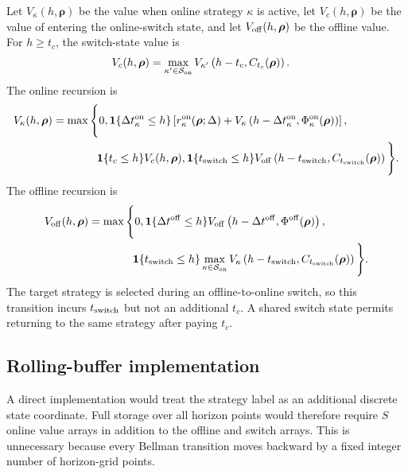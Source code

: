 \documentclass{article}
\newcommand*\I{\mathbf 1}
\begin{document}
Let $V_\kappa(h,\boldsymbol\rho)$ be the value when online strategy $\kappa$ is active, let $V_c(h,\boldsymbol\rho)$ be the value of entering the online-switch state, and let $V_{\rm off}(h,\boldsymbol\rho)$ be the offline value. For $h\geq t_c$, the switch-state value is
\begin{align}
V_c(h,\boldsymbol\rho) &= \max_{\kappa'\in\mathcal S_{\rm on}}V_{\kappa'}\left(h-t_c,C_{t_c}(\boldsymbol\rho)\right).
\end{align}
The online recursion is
\begin{align}
V_\kappa(h,\boldsymbol\rho) &= \max\Bigg\{0,\I\{\Delta t_\kappa^{\rm on}\leq h\}\left[r_\kappa^{\rm on}(\boldsymbol\rho;\Delta)+V_\kappa\left(h-\Delta t_\kappa^{\rm on},\Phi_\kappa^{\rm on}(\boldsymbol\rho)\right)\right], \notag\\
&\qquad\qquad\I\{t_c\leq h\}V_c(h,\boldsymbol\rho),\I\{t_{\rm switch}\leq h\}V_{\rm off}\left(h-t_{\rm switch},C_{t_{\rm switch}}(\boldsymbol\rho)\right)\Bigg\}.
\end{align}
The offline recursion is
\begin{align}
V_{\rm off}(h,\boldsymbol\rho) &= \max\Bigg\{0,\I\{\Delta t^{\rm off}\leq h\}V_{\rm off}\left(h-\Delta t^{\rm off},\Phi^{\rm off}(\boldsymbol\rho)\right), \notag\\
&\qquad\qquad\I\{t_{\rm switch}\leq h\}\max_{\kappa\in\mathcal S_{\rm on}}V_\kappa\left(h-t_{\rm switch},C_{t_{\rm switch}}(\boldsymbol\rho)\right)\Bigg\}.
\end{align}
The target strategy is selected during an offline-to-online switch, so this transition incurs $t_{\rm switch}$ but not an additional $t_c$. A shared switch state permits returning to the same strategy after paying $t_c$.

\subsection{Rolling-buffer implementation}

A direct implementation would treat the strategy label as an additional discrete state coordinate. Full storage over all horizon points would therefore require $S$ online value arrays in addition to the offline and switch arrays. This is unnecessary because every Bellman transition moves backward by a fixed integer number of horizon-grid points.
\end{document}
